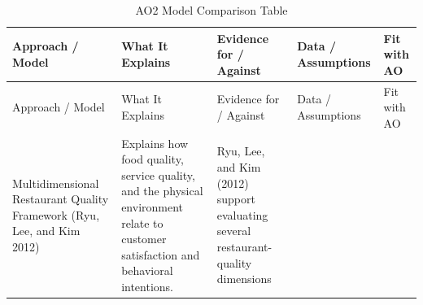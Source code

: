 \documentclass[
  12pt,
  letterpaper,
  DIV=11,
  numbers=noendperiod]{scrartcl}
\begin{document}
\begin{longtable}[]{@{}
  >{\raggedright\arraybackslash}p{}
  >{\raggedright\arraybackslash}p{}
  >{\raggedright\arraybackslash}p{}
  >{\raggedright\arraybackslash}p{}
  >{\raggedright\arraybackslash}p{}@{}}
\caption{AO2 Model Comparison Table}\tabularnewline
\toprule\noalign{}
\begin{minipage}[b]{\linewidth}\raggedright
Approach / Model
\end{minipage} & \begin{minipage}[b]{\linewidth}\raggedright
What It Explains
\end{minipage} & \begin{minipage}[b]{\linewidth}\raggedright
Evidence for / Against
\end{minipage} & \begin{minipage}[b]{\linewidth}\raggedright
Data / Assumptions
\end{minipage} & \begin{minipage}[b]{\linewidth}\raggedright
Fit with AO
\end{minipage} \\
\midrule\noalign{}
\endfirsthead
\toprule\noalign{}
\begin{minipage}[b]{\linewidth}\raggedright
Approach / Model
\end{minipage} & \begin{minipage}[b]{\linewidth}\raggedright
What It Explains
\end{minipage} & \begin{minipage}[b]{\linewidth}\raggedright
Evidence for / Against
\end{minipage} & \begin{minipage}[b]{\linewidth}\raggedright
Data / Assumptions
\end{minipage} & \begin{minipage}[b]{\linewidth}\raggedright
Fit with AO
\end{minipage} \\
\midrule\noalign{}
\endhead
\bottomrule\noalign{}
\endlastfoot
Multidimensional Restaurant Quality Framework (Ryu, Lee, and Kim 2012) &
Explains how food quality, service quality, and the physical environment
relate to customer satisfaction and behavioral intentions. & Ryu, Lee,
and Kim (2012) support evaluating several restaurant-quality dimensions

\end{longtable}
\end{document}

